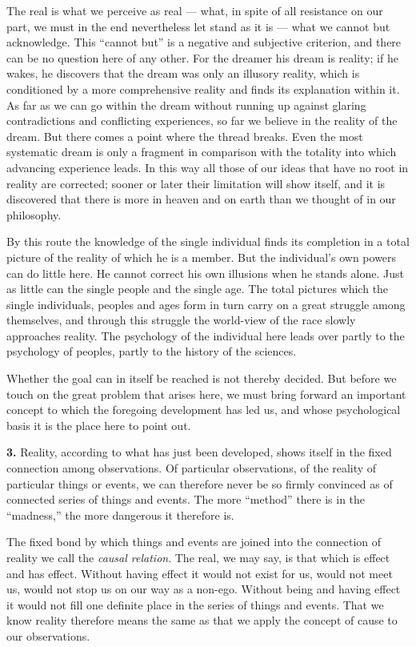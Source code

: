\documentclass[12pt,a4paper]{book}
\newcommand{\opage}[1]{\marginnote{\footnotesize\textit{[#1]}}}
\begin{document}
The real is what we perceive as real --- what, in spite of all
resistance on our part, we must in the end nevertheless let stand as it
is --- what we cannot but acknowledge. This ``cannot but'' is a negative
and subjective criterion, and there can be no question here of any
other. For the dreamer his dream is reality; if he wakes, he discovers
that the dream was only an illusory reality, which is conditioned by a
more comprehensive reality and finds its explanation within it. As far
as we can go within the dream without running up against glaring
contradictions and conflicting experiences, so far we believe in the
reality of the dream. But there comes a point where the thread breaks.
Even the most systematic dream is only a fragment in comparison with the
totality into which advancing experience leads. In this way all those of
our ideas that have no root in reality are corrected; sooner or later
their limitation will show itself, and it is discovered that there is
more in heaven and on earth than we thought of in our philosophy.

By this route the knowledge of the single individual finds its
completion in a total picture of the reality of which he is a member. But
the individual's own powers can do little here. He cannot correct his
own illusions when he stands alone. Just as little can the single people
and the single age. The total pictures which the single individuals,
peoples and ages form in turn carry on a great struggle among themselves,
and through this struggle the world-view of the race slowly approaches
reality. The psychology of the individual here leads over partly to the
psychology of peoples, partly to the history of the sciences.

Whether the goal can in itself be reached is not thereby decided. But
before we touch on the great problem that arises here, we must bring
forward an important concept to which the foregoing development has led
us, and whose psychological basis it is the place here to point out.

\textbf{3.} Reality, according to what has just been developed, shows
itself in the fixed connection among observations. Of
\opage{255}particular observations, of the reality of particular things
or events, we can therefore never be so firmly convinced as of connected
series of things and events. The more ``method'' there is in the
``madness,'' the more dangerous it therefore is.

The fixed bond by which things and events are joined into the connection
of reality we call the \emph{causal relation}. The real, we may say, is
that which is effect and has effect. Without having effect it would not
exist for us, would not meet us, would not stop us on our way as a
non-ego. Without being and having effect it would not fill one definite
place in the series of things and events. That we know reality therefore
means the same as that we apply the concept of cause to our observations.
\end{document}
